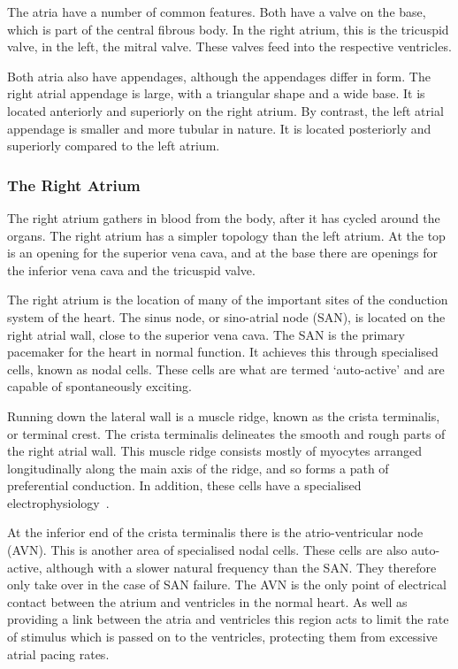 The atria have a number of common features.
Both have a valve on the base, which is part of the central fibrous body.
In the right atrium, this is the tricuspid valve, in the left, the mitral valve.
These valves feed into the respective ventricles.

Both atria also have appendages, although the appendages differ in form.
The right atrial appendage is large, with a triangular shape and a wide base.
It is located anteriorly and superiorly on the right atrium.
By contrast, the left atrial appendage is smaller and more tubular in nature.
It is located posteriorly and superiorly compared to the left atrium.

\subsubsection{The Right Atrium}

The right atrium gathers in blood from the body, after it has cycled around the
organs.
The right atrium has a simpler topology than the left atrium.
At the top is an opening for the superior vena cava, and at the base there are
openings for the inferior vena cava and the tricuspid valve.

The right atrium is the location of many of the important sites of the
conduction system of the heart.
The sinus node, or sino-atrial node (SAN), is located on the right atrial wall,
close to the superior vena cava.
The SAN is the primary pacemaker for the heart in normal function.
It achieves this through specialised cells, known as nodal cells.
These cells are what are termed `auto-active' and are capable of spontaneously
exciting.

Running down the lateral wall is a muscle ridge, known as the crista terminalis,
or terminal crest.
The crista terminalis delineates the smooth and rough parts of the right atrial
wall.
This muscle ridge consists mostly of myocytes arranged longitudinally along the
main axis of the ridge, and so forms a path of preferential conduction.
In addition, these cells have a specialised electrophysiology~\cite{Feng1998}.

At the inferior end of the crista terminalis there is the atrio-ventricular
node (AVN).
This is another area of specialised nodal cells.
These cells are also auto-active, although with a slower natural frequency than
the SAN.
They therefore only take over in the case of SAN failure.
The AVN is the only point of electrical contact between the atrium and
ventricles in the normal heart.
As well as providing a link between the atria and ventricles this region acts
to limit the rate of stimulus which is passed on to the ventricles, protecting
them from excessive atrial pacing rates.

